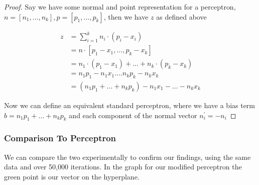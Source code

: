 \documentclass[notitlepage]{report}
\theoremstyle{definition}
\begin{document}
\begin{proof}
Say we have some normal and point representation for a perceptron, $n = [n_1, ..., n_k], p = [p_1, ..., p_k]$, then we have $z$ as defined above

\begin{align*}
z &= \sum_{i=1}^k n_i \cdot (p_i - x_i)\\
&= n \cdot [p_1 - x_1, ..., p_k - x_k]\\
&= n_1 \cdot (p_1 - x_1) + ... + n_k \cdot (p_k - x_k)\\
&= n_1p_1 - n_1x_1 .... n_kp_k - n_kx_k\\
&= (n_1p_1 + ... + n_kp_k) - n_1x_1 - ... - n_kx_k
\end{align*}

Now we can define an equivalent standard perceptron, where we have a bias term $b = n_1p_1 + ... + n_kp_k$ and each component of the normal vector $n^{'}_i = -n_i$

\end{proof}

\subsubsection{Comparison To Perceptron}
We can compare the two experimentally to confirm our findings, using the same data and over 50,000 iterations. In the graph for our modified perceptron the green point is our vector on the hyperplane.
\end{document}
